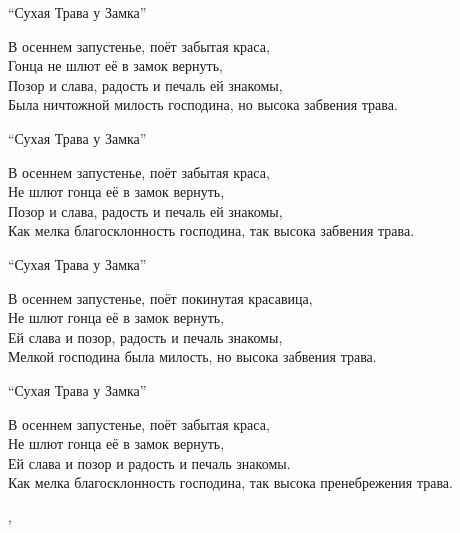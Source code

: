 \begin{ver}[1]
\begin{verses}
  \centerline{``Сухая Трава у Замка''}
  В осеннем запустенье, поёт забытая краса,\\
  Гонца не шлют её в замок вернуть,\\
  Позор и слава, радость и печаль ей знакомы,\\
  Была ничтожной милость господина, но высока забвения трава.\\
\end{verses}
\end{ver}

\begin{ver}[1]
\begin{verses}
  \centerline{``Сухая Трава у Замка''}
  В осеннем запустенье, поёт забытая краса,\\
  Не шлют гонца её в замок вернуть,\\
  Позор и слава, радость и печаль ей знакомы,\\
  Как мелка благосклонность господина, так высока забвения трава.\\
\end{verses}
\end{ver}

\begin{ver}[2]
\begin{verses}
  \centerline{``Сухая Трава у Замка''}
  В осеннем запустенье, поёт покинутая красавица,\\
  Не шлют гонца её в замок вернуть,\\
  Ей слава и позор, радость и печаль знакомы,\\
  Мелкой господина была милость, но высока забвения трава.\\
\end{verses}
\end{ver}

\begin{ver}[3]
\begin{verses}
  \centerline{``Сухая Трава у Замка''}
  В осеннем запустенье, поёт забытая краса,\\
  Не шлют гонца её в замок вернуть,\\
  Ей слава и позор и радость и печаль знакомы.\\
  Как мелка благосклонность господина, так высока пренебрежения трава.
\end{verses}
\end{ver}
\sep

